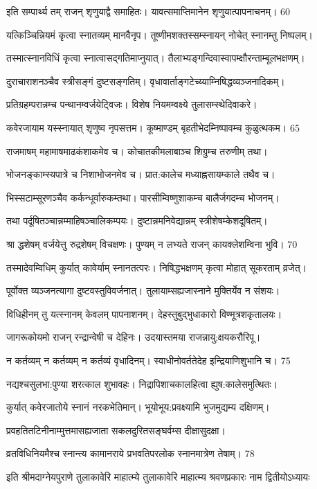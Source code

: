 इति सम्पार्थ्य तम् राजन् शृणुयाद्वै समाहितः।
 यावत्समाप्तिमानेन शृणुयात्पापनाचनम्। 60

  यत्किञ्चिन्नियमं कृत्वा स्नातव्यम् मानवैनृप।
 तूष्णीमशक्तस्सम्स्नायन् नोचेत् स्नानम्तु निष्पलम्।
 
 तस्मात्स्नानविधिं कृत्वा स्नात्वासद्गतिमाप्नुयात्।
 तैलाभ्यङ्गन्दिवास्वापम्क्षौरन्ताम्बूलभक्षणम्।
 
 दुराचाराशनञ्चैव स्त्रीसङ्गं दुष्टसङ्गतिम्।
 वृधावार्ताङ्गटेच्य्याम्निषिद्धव्यञ्जनादिकम्।
 
 प्रतिग्रहम्परान्नम्च पन्थानम्वर्जयेट्विजः।
 विशेष नियमम्वक्ष्ये तुलासम्स्थेदिवाकरे।
 
 कवेरजायाम यस्स्नायात् शृणुष्व नृपसत्तम।
 कूष्माण्डम् बृहतीभेदम्निष्पावम्च कुळुत्थकम। 65

 राजमाषम् महामाषमाढकंशाकमेव च।
 कोचातकीमलाबाञ्च शिग्रुम्च तरुणीम् तथा।
 
 भोजनङ्काम्स्यपात्रे च निशाभोजनमेव च।
 प्रात:कालेच मध्याह्नसायम्काले तथैव च।

भिस्सटाम्सूरणञ्चैव कर्कन्धूर्वारुकम्तथा।
 पारसीम्विष्णुशाकम्च बालैर्जगदम्च भोजनम्।

 तथा पर्दूषितञ्चान्नम्माहिषञ्चालिकम्पयः।
 दुष्टान्नमनिवेद्यान्नम् स्त्रीशेषम्केशदूषितम्।

 श्रा द्धशेषम् वर्जयेत्तु रुद्रशेषम् विचक्षणः।
 पुण्यम् न लभ्यते राजन् कायक्लेशम्विना भुवि। 70

  तस्मादेवम्विधिम् कुर्यात् कावेर्याम् स्नानतत्परः।
 निषिद्धभक्षणम् कृत्वा मोहात् सूकरताम् व्रजेत्।

 पूर्वोक्त व्यञ्जनत्यागा दुष्टवस्तुविवर्जनात्।
 तुलायाम्सह्यजास्नाने मुक्तिर्येव न संशयः।

 विधिहीनम् तु यत्स्नानम् केवलम् पापनाशनम्।
 देहस्तुबुद्भुधाकारो विण्मूत्रशकृतालयः।

 जागरूकोयमो राजन् रन्द्रान्वेषी च देहिनः।
 उदयास्तमया राजन्नायु:क्षयकरौरिपू।

 न कर्तव्यम् न कर्तव्यम् न कर्तव्यं वृधादिनम्।
 स्वाधीनोवर्ततेदेह इन्द्रियाणिशुभानि च। 75

  नद्यश्चसुलभा:पुण्या शरत्काल शुभावहः।
 निद्रापिशाचकालहित्वा ह्युष:कालेसमुत्थितः।
 
 कुर्यात् कवेरजातोये स्नानं नरकभेतिमान्।
 भूयोभूय:प्रवक्ष्यामि भुजमुद्यम्य दक्षिणम्।
 
 प्रवहतितटिनीनाम्मुत्तमासह्यजाता
 सकलदुरितसङ्घर्वम्स दीक्षासुदक्षा।

व्रतविधिनियमैश्च स्नान्त्य कामानराये
प्रभवतिपरलोक स्नानमात्रेण तेषाम्। 78

 इति श्रीमदाग्नेयपुराणे तुलाकावेरि माहात्म्ये तुलाकावेरि माहात्म्य श्रवणप्रकारः नाम द्वितीयोऽध्यायः

